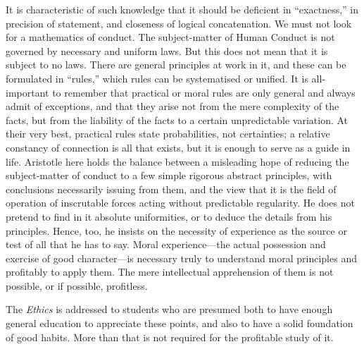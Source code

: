 It is characteristic of such knowledge that it should be deficient in
“exactness,” in precision of statement, and closeness of logical
concatenation. We must not look for a mathematics of conduct. The
subject-matter of Human Conduct is not governed by necessary and uniform laws.
But this does not mean that it is subject to no laws. There are general
principles at work in it, and these can be formulated in “rules,”
which rules can be systematised or unified. It is all-important to remember
that practical or moral rules are only general and always admit of exceptions,
and that they arise not from the mere complexity of the facts, but from the
liability of the facts to a certain unpredictable variation. At their very
best, practical rules state probabilities, not certainties; a relative
constancy of connection is all that exists, but it is enough to serve as a
guide in life. Aristotle here holds the balance between a misleading hope of
reducing the subject-matter of conduct to a few simple rigorous abstract
principles, with conclusions necessarily issuing from them, and the view that
it is the field of operation of inscrutable forces acting without predictable
regularity. He does not pretend to find in it absolute uniformities, or to
deduce the details from his principles. Hence, too, he insists on the necessity
of experience as the source or test of all that he has to say. Moral
experience—the actual possession and exercise of good character—is
necessary truly to understand moral principles and profitably to apply them.
The mere intellectual apprehension of them is not possible, or if possible,
profitless.

The \emph{Ethics} is addressed to students who are presumed both to have enough
general education to appreciate these points, and also to have a solid
foundation of good habits. More than that is not required for the profitable
study of it.

